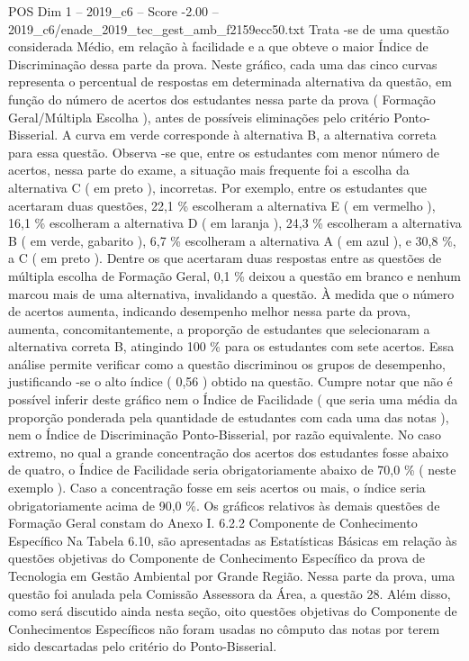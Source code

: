 \begin{textsample}{POS Dim 1 – 2019\_c6 – Score -2.00 – 2019\_c6/enade\_2019\_tec\_gest\_amb\_f2159ecc50.txt}
Trata -se de uma questão considerada Médio, em relação à facilidade e a que obteve o maior Índice de Discriminação dessa parte da prova.
Neste gráfico, cada uma das cinco curvas representa o percentual de respostas em determinada alternativa da questão, em função do número de acertos dos estudantes nessa parte da prova ( Formação Geral/Múltipla Escolha ), antes de possíveis eliminações pelo critério Ponto-Bisserial.
A curva em verde corresponde à alternativa B, a alternativa correta para essa questão.
Observa -se que, entre os estudantes com menor número de acertos, nessa parte do exame, a situação mais frequente foi a escolha da alternativa C ( em preto ), incorretas.
Por exemplo, entre os estudantes que acertaram duas questões, 22,1 \% escolheram a alternativa E ( em vermelho ), 16,1 \% escolheram a alternativa D ( em laranja ), 24,3 \% escolheram a alternativa B ( em verde, gabarito ), 6,7 \% escolheram a alternativa A ( em azul ), e 30,8 \%, a C ( em preto ).
Dentre os que acertaram duas respostas entre as questões de múltipla escolha de Formação Geral, 0,1 \% deixou a questão em branco e nenhum marcou mais de uma alternativa, invalidando a questão.
À medida que o número de acertos aumenta, indicando desempenho melhor nessa parte da prova, aumenta, concomitantemente, a proporção de estudantes que selecionaram a alternativa correta B, atingindo 100 \% para os estudantes com sete acertos.
Essa análise permite verificar como a questão discriminou os grupos de desempenho, justificando -se o alto índice ( 0,56 ) obtido na questão.
Cumpre notar que não é possível inferir deste gráfico nem o Índice de Facilidade ( que seria uma média da proporção ponderada pela quantidade de estudantes com cada uma das notas ), nem o Índice de Discriminação Ponto-Bisserial, por razão equivalente.
No caso extremo, no qual a grande concentração dos acertos dos estudantes fosse abaixo de quatro, o Índice de Facilidade seria obrigatoriamente abaixo de 70,0 \% ( neste exemplo ).
Caso a concentração fosse em seis acertos ou mais, o índice seria obrigatoriamente acima de 90,0 \%.
Os gráficos relativos às demais questões de Formação Geral constam do Anexo I. 6.2.2 Componente de Conhecimento Específico Na Tabela 6.10, são apresentadas as Estatísticas Básicas em relação às questões objetivas do Componente de Conhecimento Específico da prova de Tecnologia em Gestão Ambiental por Grande Região.
Nessa parte da prova, uma questão foi anulada pela Comissão Assessora da Área, a questão 28.
Além disso, como será discutido ainda nesta seção, oito questões objetivas do Componente de Conhecimentos Específicos não foram usadas no cômputo das notas por terem sido descartadas pelo critério do Ponto-Bisserial.

\end{textsample}
